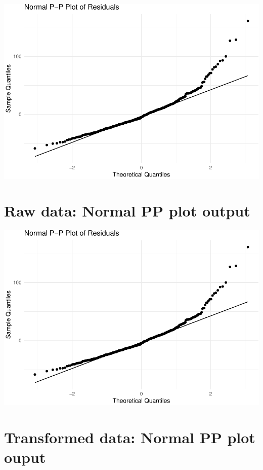 \documentclass[
]{article}
\begin{document}
\includegraphics{L8_Correlation_and_regression_pdf_files/figure-latex/unnamed-chunk-13-1.pdf}

\hypertarget{raw-data-normal-pp-plot-output}{%
\section{Raw data: Normal PP plot
output}\label{raw-data-normal-pp-plot-output}}

\includegraphics{L8_Correlation_and_regression_pdf_files/figure-latex/unnamed-chunk-14-1.pdf}

\hypertarget{transformed-data-normal-pp-plot-ouput}{%
\section{Transformed data: Normal PP plot
ouput}\label{transformed-data-normal-pp-plot-ouput}}
\end{document}
